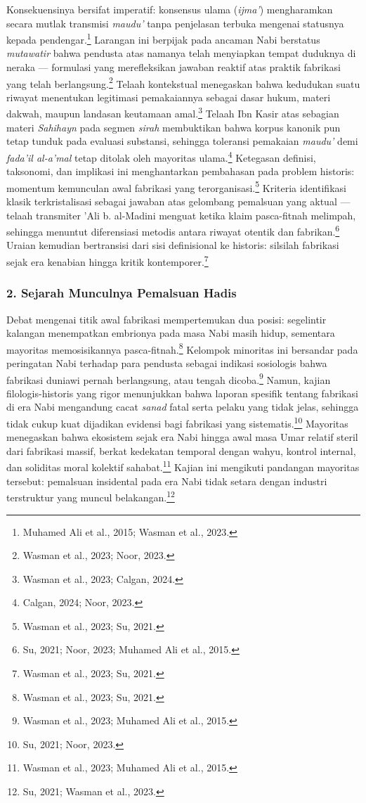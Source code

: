 Konsekuensinya bersifat imperatif: konsensus ulama (\textit{ijma'}) mengharamkan secara mutlak transmisi \textit{maudu'} tanpa penjelasan terbuka mengenai statusnya kepada pendengar.\footnote{Muhamed Ali et al., 2015; Wasman et al., 2023.} Larangan ini berpijak pada ancaman Nabi berstatus \textit{mutawatir} bahwa pendusta atas namanya telah menyiapkan tempat duduknya di neraka --- formulasi yang merefleksikan jawaban reaktif atas praktik fabrikasi yang telah berlangsung.\footnote{Wasman et al., 2023; Noor, 2023.} Telaah kontekstual menegaskan bahwa kedudukan suatu riwayat menentukan legitimasi pemakaiannya sebagai dasar hukum, materi dakwah, maupun landasan keutamaan amal.\footnote{Wasman et al., 2023; Calgan, 2024.} Telaah Ibn Kasir atas sebagian materi \textit{Sahihayn} pada segmen \textit{sirah} membuktikan bahwa korpus kanonik pun tetap tunduk pada evaluasi substansi, sehingga toleransi pemakaian \textit{maudu'} demi \textit{fada'il al-a'mal} tetap ditolak oleh mayoritas ulama.\footnote{Calgan, 2024; Noor, 2023.} Ketegasan definisi, taksonomi, dan implikasi ini menghantarkan pembahasan pada problem historis: momentum kemunculan awal fabrikasi yang terorganisasi.\footnote{Wasman et al., 2023; Su, 2021.} Kriteria identifikasi klasik terkristalisasi sebagai jawaban atas gelombang pemalsuan yang aktual --- telaah transmiter 'Ali b. al-Madini menguat ketika klaim pasca-fitnah melimpah, sehingga menuntut diferensiasi metodis antara riwayat otentik dan fabrikan.\footnote{Su, 2021; Noor, 2023; Muhamed Ali et al., 2015.} Uraian kemudian bertransisi dari sisi definisional ke historis: silsilah fabrikasi sejak era kenabian hingga kritik kontemporer.\footnote{Wasman et al., 2023; Su, 2021.}

\subsubsection*{2. Sejarah Munculnya Pemalsuan Hadis}

Debat mengenai titik awal fabrikasi mempertemukan dua posisi: segelintir kalangan menempatkan embrionya pada masa Nabi masih hidup, sementara mayoritas memosisikannya pasca-fitnah.\footnote{Wasman et al., 2023; Su, 2021.} Kelompok minoritas ini bersandar pada peringatan Nabi terhadap para pendusta sebagai indikasi sosiologis bahwa fabrikasi duniawi pernah berlangsung, atau tengah dicoba.\footnote{Wasman et al., 2023; Muhamed Ali et al., 2015.} Namun, kajian filologis-historis yang rigor menunjukkan bahwa laporan spesifik tentang fabrikasi di era Nabi mengandung cacat \textit{sanad} fatal serta pelaku yang tidak jelas, sehingga tidak cukup kuat dijadikan evidensi bagi fabrikasi yang sistematis.\footnote{Su, 2021; Noor, 2023.} Mayoritas menegaskan bahwa ekosistem sejak era Nabi hingga awal masa Umar relatif steril dari fabrikasi massif, berkat kedekatan temporal dengan wahyu, kontrol internal, dan soliditas moral kolektif sahabat.\footnote{Wasman et al., 2023; Muhamed Ali et al., 2015.} Kajian ini mengikuti pandangan mayoritas tersebut: pemalsuan insidental pada era Nabi tidak setara dengan industri terstruktur yang muncul belakangan.\footnote{Su, 2021; Wasman et al., 2023.}


